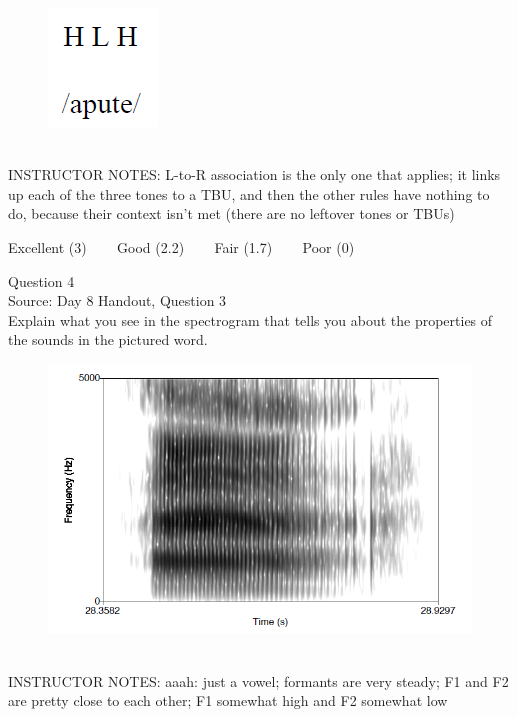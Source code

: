 \documentclass[12pt]{article}
\begin{document}
\begin{figure}[H]
\includegraphics{../images/mendetone_a.png}
\end{figure}

~\\
INSTRUCTOR NOTES: L-to-R association is the only one that applies; it links up each of the three tones to a TBU, and then the other rules have nothing to do, because their context isn't met (there are no leftover tones or TBUs)


\vfill
Excellent (3) ~~~ Good (2.2) ~~~ Fair (1.7) ~~~ Poor (0)
\newpage

{\large Question 4}\\

Source: Day 8 Handout, Question 3\\

Explain what you see in the spectrogram that tells you about the properties of the sounds in the pictured word.\\

\begin{figure}[H]
\includegraphics{../images/spectrogram_aaah.png}
\end{figure}

~\\
INSTRUCTOR NOTES: aaah: just a vowel; formants are very steady; F1 and F2 are pretty close to each other; F1 somewhat high and F2 somewhat low
\end{document}
